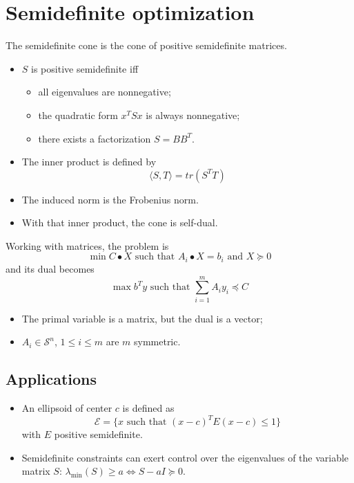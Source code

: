 \documentclass[12pt, openany]{report}
\theoremstyle{definition}
\begin{document}
\section{Semidefinite optimization}
The semidefinite cone is the cone of positive semidefinite matrices.
\begin{itemize}
    \item $S$ is positive semidefinite iff 
    \begin{itemize}
        \item all eigenvalues are nonnegative;
        \item the quadratic form $x^TSx$ is always nonnegative;
        \item there exists a factorization $S=BB^T$.
    \end{itemize}
    \item The inner product is defined by 
    \begin{equation}
        \langle S,T\rangle = tr(S^TT)
    \end{equation}
    \item The induced norm is the Frobenius norm.
    \item With that inner product, the cone is self-dual. 
\end{itemize}
Working with matrices, the problem is
\begin{equation}
    \min C \bullet X \text{ such that }A_i \bullet X = b_i \text{ and } X\succeq 0
\end{equation}
and its dual becomes 
\begin{equation}
    \max b^Ty \text{ such that }\sum_{i=1}^m A_i y_i \preceq C
\end{equation}
\begin{itemize}
    \item The primal variable is a matrix, but the dual is a vector;
    \item $A_i\in \mathcal{S}^n$, $1\le i \le m$ are $m$ symmetric.
\end{itemize}
\subsection{Applications}
\begin{itemize}
    \item An ellipsoid of center $c$ is defined as 
    \begin{equation}
        \mathcal{E} = \{x\text{ such that }(x-c)^TE(x-c) \le 1\}
    \end{equation}
    with $E$ positive semidefinite.
    \item Semidefinite constraints can exert control over the eigenvalues of the variable matrix $S$: $\lambda_{\min}(S) \ge a \Longleftrightarrow S-aI \succeq 0$.
\end{itemize}
\end{document}
